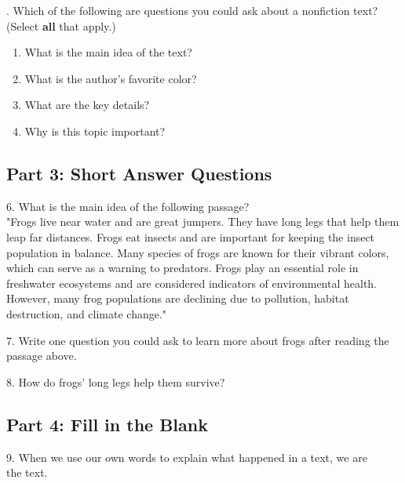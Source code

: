 \documentclass[12pt]{article}
\begin{document}
\vspace{1cm}
. Which of the following are questions you could ask about a nonfiction text? (Select \textbf{all} that apply.)  
\begin{enumerate}[label=\Alph*.]
    \item What is the main idea of the text?  
    \item What is the author’s favorite color?  
    \item What are the key details?  
    \item Why is this topic important?  
\end{enumerate}

\vspace{1cm}

\subsection*{Part 3: Short Answer Questions}

6. What is the main idea of the following passage?\\
"Frogs live near water and are great jumpers. They have long legs that help them leap far distances. Frogs eat insects and are important for keeping the insect \\population in balance. Many species of frogs are known for their vibrant colors, which can serve as a warning to predators. Frogs play an essential role in freshwater ecosystems and are considered indicators of environmental health. However, many frog populations are declining due to pollution, habitat destruction, and climate change."\\

\vspace{3cm}

7. Write one question you could ask to learn more about frogs after reading the passage above.

\vspace{3cm}

8. How do frogs’ long legs help them survive?

\vspace{3cm}

\subsection*{Part 4: Fill in the Blank}

9. When we use our own words to explain what happened in a text, we are \\ \underline{\hspace{4cm}} the text.
\end{document}
